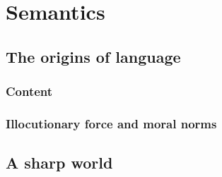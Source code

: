 \def\mychapter{VII}

\chapter{Semantics}\label{ch:semantics}
\section{The origins of language}
\subsection{Content}
\subsection{Illocutionary force and moral norms}
\section{A sharp world}
\chaptertail


